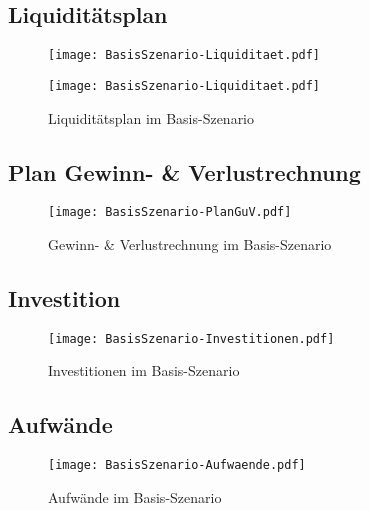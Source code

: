 \subsection{Liquiditätsplan}
\begin{figure}[htp!]
	\centering
	\texttt{[image: BasisSzenario-Liquiditaet.pdf]}
	\label{fig:BasisSzenario-Liquiditaet-1}
\end{figure}
\begin{figure}[htp!]
	\centering
	\texttt{[image: BasisSzenario-Liquiditaet.pdf]}
	\caption{Liquiditätsplan im Basis-Szenario}
	\label{fig:BasisSzenario-Liquiditaet-2}
\end{figure}

\newpage
\subsection{Plan Gewinn- \& Verlustrechnung}
\begin{figure}[htp!]
	\centering
	\texttt{[image: BasisSzenario-PlanGuV.pdf]}
	\caption{Gewinn- \& Verlustrechnung im Basis-Szenario}
	\label{fig:BasisSzenario-GuV}
\end{figure}

\newpage
\subsection{Investition}
\begin{figure}[htp!]
	\centering
	\texttt{[image: BasisSzenario-Investitionen.pdf]}
	\caption{Investitionen im Basis-Szenario}
	\label{fig:BasisSzenario-Investitionen}
\end{figure}

\begin{landscape}
	\subsection{Aufwände}
	\begin{figure}[htp!]
		\centering
		\texttt{[image: BasisSzenario-Aufwaende.pdf]}
		\caption{Aufwände im Basis-Szenario}
		\label{fig:BasisSzenario-Aufwaende}
	\end{figure}
\end{landscape}

\newpage
